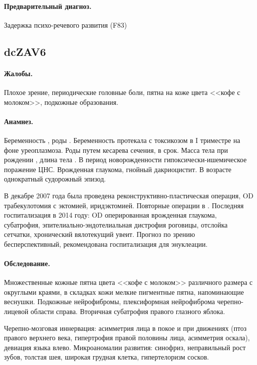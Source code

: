 \documentclass[a4paper,14pt]{extarticle}
\newcommand{\gramm}{г}
\newcommand{\cm}{см}
\newcommand{\months}{мес.}
\begin{document}
\paragraph{Предварительный диагноз.}
Задержка психо-речевого развития (F83)

\subsection*{dcZAV6}

\paragraph{Жалобы.}
Плохое зрение, периодические головные боли, пятна на коже цвета <<кофе с молоком>>, подкожные образования.

\paragraph{Анамнез.}
Беременность , роды .
Беременность протекала с токсикозом в I триместре на фоне уреоплазмоза.
Роды путем кесарева сечения, в срок.
Масса тела при рождении \numprint[\gramm]{4040}, длина тела \numprint[\cm]{53}.
В период новорожденности гипоксически-ишемическое поражение ЦНС.
Врожденная глаукома, гнойный дакриоцистит.
В возрасте \numprint[\months]{3} однократный судорожный эпизод.

В декабре 2007 года была проведена реконструктивно-пластическая операция, OD трабекулотомия с эктомией, иридэктомией.
Повторные операции в .
Последняя госпитализация в 2014 году: OD оперированная врожденная глаукома, субатрофия, эпителиально-эндотелиальная дистрофия роговицы, отслойка сетчатки, хронический вялотекущий увеит.
Прогноз по зрению бесперспективный, рекомендована госпитализация для энуклеации.

\paragraph{Обследование.}
Множественные кожные пятна цвета <<кофе с молоком>> различного размера с округлыми краями, в складках кожи мелкие пигментные пятна, напоминающие веснушки.
Подкожные нейрофибромы, плексиформная нейрофиброма черепно-лицевой области справа.
Вторичная субатрофия правого глазного яблока.

Черепно-мозговая иннервация: асимметрия лица в покое и при движениях (птоз правого верхнего века, гипертрофия правой половины лица, асимметрия оскала), девиация языка влево.
Микроаномалии развития: синофриз, неправильный рост зубов, толстая шея, широкая грудная клетка, гипертелоризм сосков.
\end{document}
